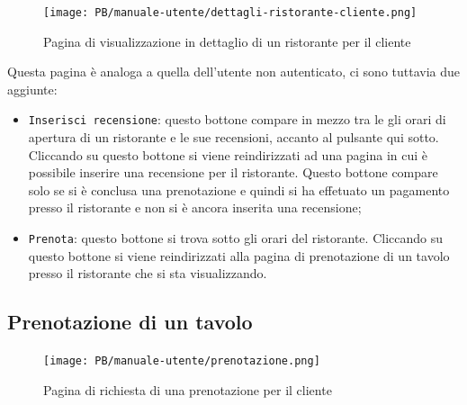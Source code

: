 \begin{figure}[htbp]
    \centering
	\texttt{[image: PB/manuale-utente/dettagli-ristorante-cliente.png]}
    \caption{Pagina di visualizzazione in dettaglio di un ristorante per il
	cliente}
\end{figure}
\newpage
Questa pagina è analoga a quella dell'utente non autenticato, ci sono tuttavia
due aggiunte:
\begin{itemize}
	\item \texttt{Inserisci recensione}: questo bottone compare in mezzo tra le
		gli orari di apertura di un ristorante e le sue recensioni, accanto al
		pulsante qui sotto. Cliccando su questo bottone si viene reindirizzati
		ad una pagina in cui è possibile inserire una recensione per il
		ristorante. Questo bottone compare solo se si è conclusa una
		prenotazione e quindi si ha effetuato un pagamento presso il ristorante e non si è ancora inserita una
		recensione;

	\item \texttt{Prenota}: questo bottone si trova sotto gli orari del
		ristorante. Cliccando su questo bottone si viene reindirizzati alla
		pagina di prenotazione di un tavolo presso il ristorante che si sta
		visualizzando.
\end{itemize}

\subsection{Prenotazione di un tavolo}

\begin{figure}[htbp]
    \centering
	\texttt{[image: PB/manuale-utente/prenotazione.png]}
    \caption{Pagina di richiesta di una prenotazione per il cliente}
\end{figure}

